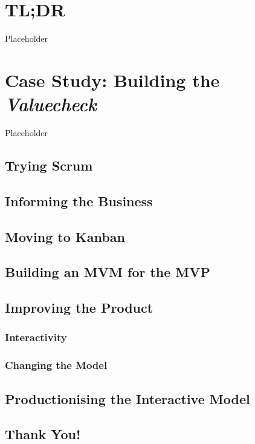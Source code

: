 \documentclass[]{book}
\begin{document}
\hypertarget{tldr}{%
\chapter{TL;DR}\label{tldr}}

Placeholder

\hypertarget{case-study-building-the-valuecheck}{%
\chapter{\texorpdfstring{Case Study: Building the \emph{Valuecheck}}{Case Study: Building the Valuecheck}}\label{case-study-building-the-valuecheck}}

Placeholder

\hypertarget{trying-scrum}{%
\section{Trying Scrum}\label{trying-scrum}}

\hypertarget{informing-the-business}{%
\section{Informing the Business}\label{informing-the-business}}

\hypertarget{moving-to-kanban}{%
\section{Moving to Kanban}\label{moving-to-kanban}}

\hypertarget{building-an-mvm-for-the-mvp}{%
\section{Building an MVM for the MVP}\label{building-an-mvm-for-the-mvp}}

\hypertarget{improving-the-product}{%
\section{Improving the Product}\label{improving-the-product}}

\hypertarget{interactivity}{%
\subsection{Interactivity}\label{interactivity}}

\hypertarget{changing-the-model}{%
\subsection{Changing the Model}\label{changing-the-model}}

\hypertarget{productionising-the-interactive-model}{%
\section{Productionising the Interactive Model}\label{productionising-the-interactive-model}}

\hypertarget{thank-you}{%
\section{Thank You!}\label{thank-you}}


\end{document}
